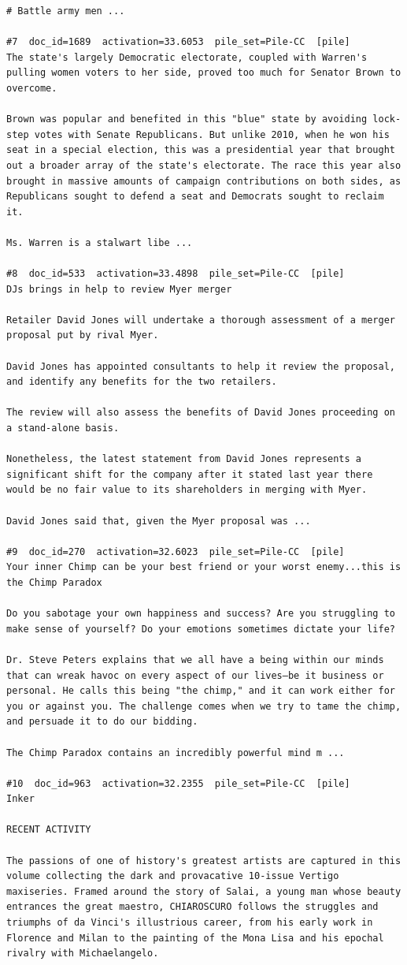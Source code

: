 \begin{verbatim}
# Battle army men ...

#7  doc_id=1689  activation=33.6053  pile_set=Pile-CC  [pile]
The state's largely Democratic electorate, coupled with Warren's pulling women voters to her side, proved too much for Senator Brown to overcome.

Brown was popular and benefited in this "blue" state by avoiding lock-step votes with Senate Republicans. But unlike 2010, when he won his seat in a special election, this was a presidential year that brought out a broader array of the state's electorate. The race this year also brought in massive amounts of campaign contributions on both sides, as Republicans sought to defend a seat and Democrats sought to reclaim it.

Ms. Warren is a stalwart libe ...

#8  doc_id=533  activation=33.4898  pile_set=Pile-CC  [pile]
DJs brings in help to review Myer merger

Retailer David Jones will undertake a thorough assessment of a merger proposal put by rival Myer.

David Jones has appointed consultants to help it review the proposal, and identify any benefits for the two retailers.

The review will also assess the benefits of David Jones proceeding on a stand-alone basis.

Nonetheless, the latest statement from David Jones represents a significant shift for the company after it stated last year there would be no fair value to its shareholders in merging with Myer.

David Jones said that, given the Myer proposal was ...

#9  doc_id=270  activation=32.6023  pile_set=Pile-CC  [pile]
Your inner Chimp can be your best friend or your worst enemy...this is the Chimp Paradox

Do you sabotage your own happiness and success? Are you struggling to make sense of yourself? Do your emotions sometimes dictate your life?

Dr. Steve Peters explains that we all have a being within our minds that can wreak havoc on every aspect of our lives—be it business or personal. He calls this being "the chimp," and it can work either for you or against you. The challenge comes when we try to tame the chimp, and persuade it to do our bidding.

The Chimp Paradox contains an incredibly powerful mind m ...

#10  doc_id=963  activation=32.2355  pile_set=Pile-CC  [pile]
Inker

RECENT ACTIVITY

The passions of one of history's greatest artists are captured in this volume collecting the dark and provacative 10-issue Vertigo maxiseries. Framed around the story of Salai, a young man whose beauty entrances the great maestro, CHIAROSCURO follows the struggles and triumphs of da Vinci's illustrious career, from his early work in Florence and Milan to the painting of the Mona Lisa and his epochal rivalry with Michaelangelo.

\end{verbatim}

